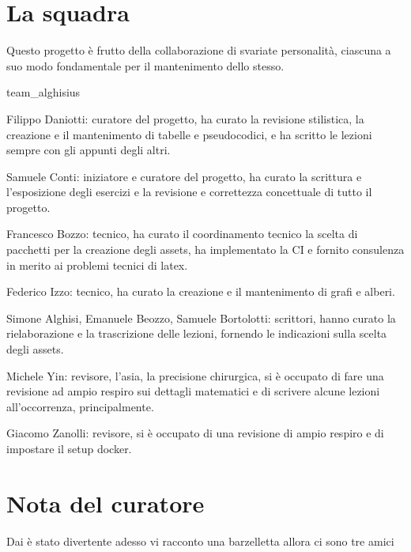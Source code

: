 \documentclass[class=book, crop=false, oneside, 12pt]{standalone}
\begin{document}
\section*{La squadra}
Questo progetto è frutto della collaborazione di svariate personalità, ciascuna a suo modo fondamentale per il mantenimento dello stesso.
\begin{labeling}{team_alghisius}
    \item[p1ps] Filippo Daniotti: curatore del progetto, ha curato la revisione stilistica, la creazione e il mantenimento di tabelle e pseudocodici, e ha scritto le lezioni sempre con gli appunti degli altri.
    \item[sam4retas] Samuele Conti: iniziatore e curatore del progetto, ha curato la scrittura e l'esposizione degli esercizi e la revisione e correttezza concettuale di tutto il progetto.
    \item[frab0zzo] Francesco Bozzo: tecnico, ha curato il coordinamento tecnico la scelta di pacchetti per la creazione degli assets, ha implementato la CI e fornito consulenza in merito ai problemi tecnici di latex.
    \item[f1zzo] Federico Izzo: tecnico, ha curato la creazione e il mantenimento di grafi e alberi.
    \item[team_alghisius] Simone Alghisi, Emanuele Beozzo, Samuele Bortolotti: scrittori, hanno curato la rielaborazione e la trascrizione delle lezioni, fornendo le indicazioni sulla scelta degli assets.
    \item[ch!n4] Michele Yin: revisore, l'asia, la precisione chirurgica, si è occupato di fare una revisione ad ampio respiro sui dettagli matematici e di scrivere alcune lezioni all'occorrenza, principalmente.
    \item[j4bb] Giacomo Zanolli: revisore, si è occupato di una revisione di ampio respiro e di impostare il setup docker. 
\end{labeling}

\section*{Nota del curatore}
Dai è stato divertente adesso vi racconto una barzelletta allora ci sono tre amici
\end{document}
